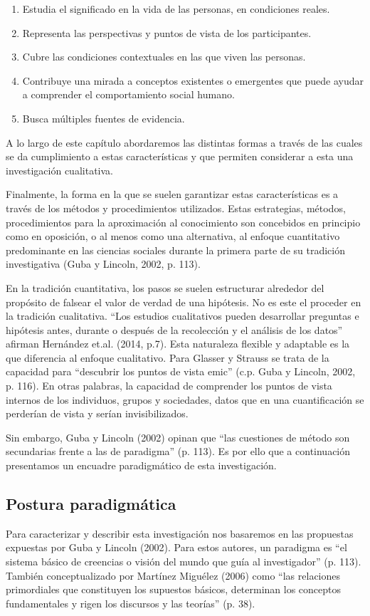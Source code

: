 \begin{enumerate}
    \item Estudia el significado en la vida de las personas, en condiciones
    reales.
    \item Representa las perspectivas y puntos de vista de los participantes.
    \item Cubre las condiciones contextuales en las que viven las personas.
    \item Contribuye una mirada a conceptos existentes o emergentes que puede
    ayudar a comprender el comportamiento social humano.
    \item Busca múltiples fuentes de evidencia.
\end{enumerate}

A lo largo de este capítulo abordaremos las distintas formas a través de las
cuales se da cumplimiento a estas características y que permiten considerar a
esta una investigación cualitativa.

Finalmente, la forma en la que se suelen garantizar estas características es a
través de los métodos y procedimientos utilizados.
Estas estrategias, métodos, procedimientos para la aproximación al conocimiento
son concebidos en principio como en oposición, o al menos como una alternativa,
al enfoque cuantitativo predominante en las ciencias sociales durante la primera
parte de su tradición investigativa (Guba y Lincoln, 2002, p. 113).

En la tradición cuantitativa, los pasos se suelen estructurar alrededor del
propósito de falsear el valor de verdad de una hipótesis.
No es este el proceder en la tradición cualitativa.
“Los estudios cualitativos pueden desarrollar preguntas e hipótesis antes,
durante o después de la recolección y el análisis de los datos” afirman
Hernández et.al. (2014, p.7).
Esta naturaleza flexible y adaptable es la que diferencia al enfoque
cualitativo.
Para Glasser y Strauss se trata de la capacidad para “descubrir los puntos de
vista emic” (c.p. Guba y Lincoln, 2002, p. 116).
En otras palabras, la capacidad de comprender los puntos de vista internos de
los individuos, grupos y sociedades, datos que en una cuantificación se
perderían de vista y serían invisibilizados.

Sin embargo, Guba y Lincoln (2002) opinan que “las cuestiones de método son
secundarias frente a las de paradigma” (p. 113).
Es por ello que a continuación presentamos un encuadre paradigmático de esta
investigación.

\subsection{Postura paradigmática}
Para caracterizar y describir esta investigación nos basaremos en las propuestas
expuestas por Guba y Lincoln (2002).
Para estos autores, un paradigma es “el sistema básico de creencias o visión del
mundo que guía al investigador” (p. 113).
También conceptualizado por Martínez Miguélez (2006) como “las relaciones
primordiales que constituyen los supuestos básicos, determinan los conceptos
fundamentales y rigen los discursos y las teorías” (p. 38).

